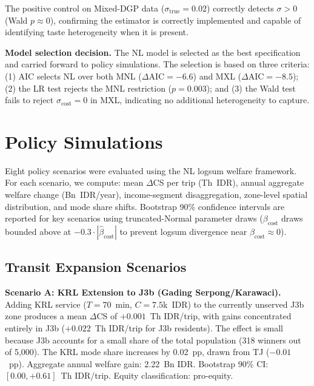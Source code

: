 \documentclass[12pt,a4paper]{article}
\begin{document}
The positive control on Mixed-DGP data ($\sigma_{\text{true}} = 0.02$) correctly detects $\sigma > 0$ (Wald $p \approx 0$), confirming the estimator is correctly implemented and capable of identifying taste heterogeneity when it is present.

\textbf{Model selection decision.} The NL model is selected as the best specification and carried forward to policy simulations. The selection is based on three criteria: (1) AIC selects NL over both MNL ($\Delta\text{AIC} = -6.6$) and MXL ($\Delta\text{AIC} = -8.5$); (2) the LR test rejects the MNL restriction ($p = 0.003$); and (3) the Wald test fails to reject $\sigma_{\text{cost}} = 0$ in MXL, indicating no additional heterogeneity to capture.

\section{Policy Simulations}

Eight policy scenarios were evaluated using the NL logsum welfare framework. For each scenario, we compute: mean $\Delta$CS per trip (Th~IDR), annual aggregate welfare change (Bn~IDR/year), income-segment disaggregation, zone-level spatial distribution, and mode share shifts. Bootstrap 90\% confidence intervals are reported for key scenarios using truncated-Normal parameter draws ($\beta_{\text{cost}}$ draws bounded above at $-0.3 \cdot |\hat{\beta}_{\text{cost}}|$ to prevent logsum divergence near $\beta_{\text{cost}} \approx 0$).

\subsection{Transit Expansion Scenarios}

\textbf{Scenario A: KRL Extension to J3b (Gading Serpong/Karawaci).}
Adding KRL service ($T = 70$~min, $C = 7.5$k~IDR) to the currently unserved J3b zone produces a mean $\Delta$CS of $+0.001$~Th IDR/trip, with gains concentrated entirely in J3b ($+0.022$~Th IDR/trip for J3b residents). The effect is small because J3b accounts for a small share of the total population (318 winners out of 5,000). The KRL mode share increases by 0.02~pp, drawn from TJ ($-0.01$~pp). Aggregate annual welfare gain: 2.22~Bn IDR. Bootstrap 90\% CI: $[0.00, +0.61]$~Th IDR/trip. Equity classification: pro-equity.
\end{document}
